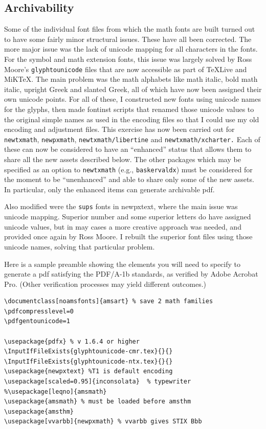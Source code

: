 \documentclass[11pt]{article}
\theoremstyle{oldplain}
\theoremstyle{plain}
\begin{document}
\subsection{Archivability}
Some of the individual font files from which the math fonts are built turned out to have some fairly minor structural issues. These have all been corrected. The more major issue was the lack of unicode mapping for all characters in the fonts. For the symbol and math extension fonts, this issue was largely solved by Ross Moore's {\tt glyphtounicode} files that are now accessible as part of TeXLive and MiKTeX. The main problem was the math alphabets like math italic, bold math italic, upright Greek and slanted Greek, all of which have now been assigned their own unicode points. For all of these, I constructed new fonts using unicode names for the glyphs, then made \textsf{fontinst} scripts that renamed those unicode values to the original simple names as used in the encoding files so that I could use my old encoding and adjustment files. This exercise has now been carried out for {\tt newtxmath}, {\tt newpxmath}, {\tt newtxmath/libertine} and {\tt newtxmath/xcharter.} Each of these can now be considered to have an ``enhanced'' status that allows them to share all the new assets described below. The other packages which may be specified as an option to {\tt newtxmath} (e.g., {\tt  baskervaldx}) must be considered for the moment to be ``unenhanced'' and able to share only some of the new assets. In particular, only the enhanced items can generate archivable pdf. 

Also modified were the {\tt sups} fonts in {newpxtext}, where the main issue was unicode mapping. Superior number and some superior letters do have assigned unicode values, but in may cases a more creative approach was needed, and provided once again by Ross Moore. I rebuilt the superior font files using those unicode names, solving that particular problem.

Here is a sample  preamble showing the elements you will need to specify to generate a pdf satisfying the PDF/A-1b standards, as verified by Adobe Acrobat Pro. (Other verification processes may yield different outcomes.)
\begin{verbatim}
\documentclass[noamsfonts]{amsart} % save 2 math families 
\pdfcompresslevel=0 
\pdfgentounicode=1 
 
\usepackage{pdfx} % v 1.6.4 or higher
\InputIfFileExists{glyphtounicode-cmr.tex}{}{} 
\InputIfFileExists{glyphtounicode-ntx.tex}{}{}
\usepackage{newpxtext} %T1 is default encoding
\usepackage[scaled=0.95]{inconsolata}  % typewriter
%\usepackage[leqno]{amsmath} 
\usepackage{amsmath} % must be loaded before amsthm
\usepackage{amsthm}
\usepackage[vvarbb]{newpxmath} % vvarbb gives STIX Bbb
\end{verbatim}
\end{document}
